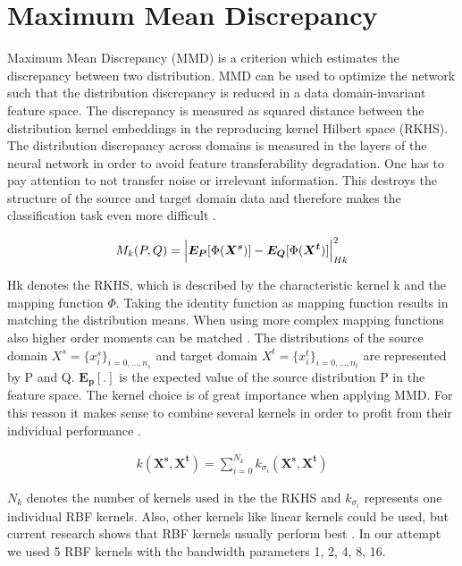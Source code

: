 \section{Maximum Mean Discrepancy}
Maximum Mean Discrepancy (MMD) is a criterion which estimates the discrepancy between two distribution. MMD can be used to optimize the network such that the distribution discrepancy is reduced in a data domain-invariant feature space. The discrepancy is measured as squared distance between the distribution kernel embeddings in the reproducing kernel Hilbert space (RKHS). The distribution discrepancy across domains is measured in the layers of the neural network in order to avoid feature transferability degradation. One has to pay attention to not transfer noise or irrelevant information. This destroys the structure of the source and target domain data and therefore makes the classification task even more difficult \cite{li2020domain}. 

\begin{align}
    M_{k}(P,Q) = \Bigl|  \boldsymbol{E_{P}}[\Phi(\boldsymbol{X^{s}})] - \boldsymbol{E_{Q}}[\Phi(\boldsymbol{X^{t}})]     \Bigl|^{2}_{Hk}
\end{align}

Hk denotes the RKHS, which is described by the characteristic kernel k and the mapping function $\Phi$. Taking the identity function as mapping function results in matching the distribution means. When using more complex mapping functions also higher order moments can be matched \cite{Yujia2015}. The distributions of the source domain $X^{s} = \{{x}_{i}^{s}\}_{i=0,...,n_{s}}$ and target domain $X^{t} = \{{x}_{i}^{t}\}_{i=0,...,n_{t}}$ are represented by P and Q. $\boldsymbol{E_{p}[.]}$ is the expected value of the source distribution P in the feature space. The kernel choice is of great importance when applying MMD. For this reason it makes sense to combine several kernels in order to profit from their individual performance \cite{li2020domain}.

\begin{align}
    k(\boldsymbol{X^{s}}, \boldsymbol{X^{t}}) = \sum_{i=0}^{N_{k}} k_{\sigma_{i}}(\boldsymbol{X^{s}}, \boldsymbol{X^{t}})
\end{align}

$N_{k}$ denotes the number of kernels used in the the RKHS and $k_{\sigma_{i}}$ represents one individual RBF kernels. Also, other kernels like linear kernels could be used, but current research shows that RBF kernels usually perform best \cite{AZAMFAR2020103932}. In our attempt we used 5 RBF kernels with the bandwidth parameters 1, 2, 4, 8, 16.

